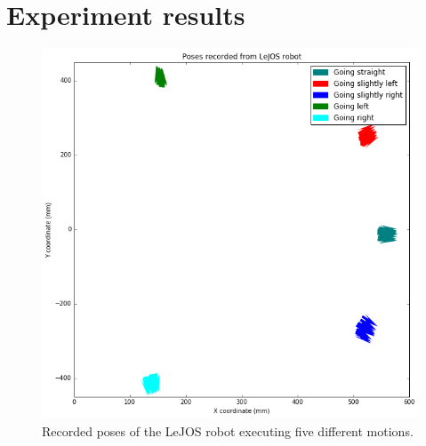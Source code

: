 \documentclass[paper=a4, fontsize=11pt]{scrartcl} %
\title{\hmwkClass \\
       \hmwkTitle}
\author{\hmwkAuthorFullName}
\date{\hmwkDueDate}
\begin{document}
    \maketitle
    \thispagestyle{fancy} %

    \section{Experiment results}

    \begin{figure}[h!]
        \begin{center}
            \setlength{\fboxsep}{0.5pt} %
            \setlength{\fboxrule}{0.5pt}
            \includegraphics[width=14cm,fbox]{images/poses_plot_5_experiments.png}
            \caption{Recorded poses of the LeJOS robot executing five different motions.}
        \end{center}
    \end{figure}
\end{document}
